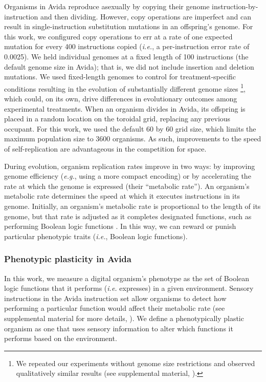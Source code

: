\documentclass[utf8]{frontiersSCNS} %
\begin{document}
\begin{raggedbottom}
Organisms in Avida reproduce asexually by copying their genome instruction-by-instruction and then dividing.
However, copy operations are imperfect and can result in single-instruction substitution mutations in an offspring's genome.
For this work, we configured copy operations to err at a rate of one expected mutation for every 400 instructions copied (\textit{i.e.}, a per-instruction error rate of 0.0025).
We held individual genomes at a fixed length of 100 instructions (the default genome size in Avida); that is, we did not include insertion and deletion mutations.
We used fixed-length genomes to control for treatment-specific conditions resulting in the evolution of substantially different genome sizes \citep{supplemental_material}\footnote{
We repeated our experiments without genome size restrictions and observed qualitatively similar results (see supplemental material, \citealt{supplemental_material}).
}, which could, on its own, drive differences in evolutionary outcomes among experimental treatments.
When an organism divides in Avida, its offspring is placed in a random location on the toroidal grid, replacing any previous occupant.
For this work, we used the default 60 by 60 grid size, which limits the maximum population size to 3600 organisms.
As such, improvements to the speed of self-replication are advantageous in the competition for space.

During evolution, organism replication rates improve in two ways: by improving genome efficiency (\textit{e.g.}, using a more compact encoding) or by accelerating the rate at which the genome is expressed (their ``metabolic rate'').
An organism's metabolic rate determines the speed at which it executes instructions in its genome.
Initially, an organism's metabolic rate is proportional to the length of its genome, but that rate is adjusted as it completes designated functions, such as performing Boolean logic functions \citep{ofria_avida:_2009}.
In this way, we can reward or punish particular phenotypic traits (\textit{i.e.}, Boolean logic functions).

\subsubsection{Phenotypic plasticity in Avida}
\label{sec:methods:avida:plasticity}

In this work, we measure a digital organism's phenotype as the set of Boolean logic functions that it performs (\textit{i.e.} expresses) in a given environment.
Sensory instructions in the Avida instruction set allow organisms to detect how performing a particular function would affect their metabolic rate (see supplemental material for more details, \citealt{supplemental_material}).
We define a phenotypically plastic organism as one that uses sensory information to alter which functions it performs based on the environment.


\end{raggedbottom}
\end{document}

